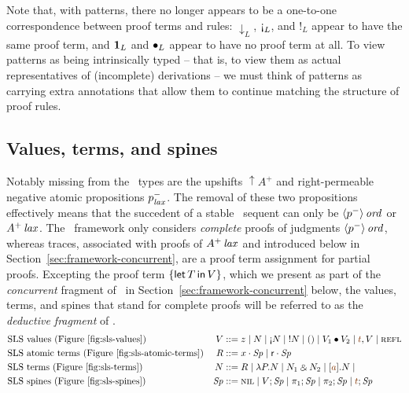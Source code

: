 Note that, with patterns, there no longer appears to be a one-to-one
correspondence between proof terms and rules: ${\downarrow}_L$,
${\gnab}_L$, and ${!}_L$ appear to have the same proof term, and
${\mathbf{1}}_L$ and ${\mathbin{\bullet}}_L$ appear to have no proof term at all. To
view patterns as being intrinsically typed -- that is, to view them as
actual representatives of (incomplete) derivations -- we must think of
patterns as carrying extra annotations that allow them to continue
matching the structure of proof rules.

\subsection{Values, terms, and spines}
\label{sec:framework-deductive}

Notably missing from the \sls~types are the upshifts ${\uparrow}A^+$
and right-permeable negative atomic propositions $p^-_{\it lax}$. The
removal of these two propositions effectively means that the succedent
of a stable \sls~sequent can only be ${\langle {p^-} \rangle}\,{{\it ord}}$ or
${A^+}\,{{\it lax}}$. The \sls~framework only considers {\it complete} proofs
of judgments ${\langle {p^-} \rangle}\,{{\it ord}}$, whereas traces, associated with
proofs of ${A^+}\,{{\it lax}}$ and introduced below in
Section~\ref{sec:framework-concurrent}, are a proof term assignment
for partial proofs. Excepting the proof term $\{{\sf let}\,{T}\,{\sf in}\, {V} \}$, which we
present as part of the {\it concurrent} fragment of \sls~in
Section~\ref{sec:framework-concurrent} below, the values, terms, and
spines that stand for complete proofs will be referred to as the {\it
  deductive fragment} of \sls.
\begin{align*}
&\mbox{\sls~values (Figure~\ref{fig:sls-values})}& 
V & ::= z
   \mid N
   \mid \tgnabr{N}
   \mid \tbangr{N}
   \mid \toner
   \mid \tfuser{V_1}{V_2}
   \mid \texistsr{\lf{t}}{V}
   \mid \tunifr
\\
&\mbox{\sls~atomic terms (Figure~\ref{fig:sls-atomic-terms})}&
R & ::= \tfocusl{x}{\Sp} 
   \mid \tfocusl{\sf r}{\Sp} 
\\
&\mbox{\sls~terms (Figure~\ref{fig:sls-terms})}&
N & ::= R
   \mid \lambda P.N 
   \mid N_1 \with N_2
   \mid \tforallr{\lf{a}}{N}
   \mid 
\\
&\mbox{\sls~spines (Figure~\ref{fig:sls-spines})}&
\Sp & ::= \tnil 
   \mid V; \Sp
   \mid \pi_1; \Sp 
   \mid \pi_2; \Sp
   \mid \lf{t}; \Sp
\end{align*}

